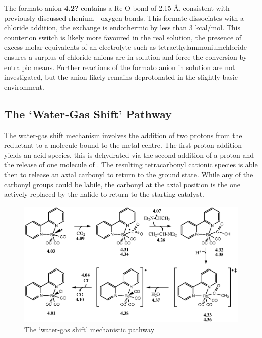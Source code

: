 The formato anion \textbf{4.2?} contains a Re-O bond of 2.15 \r{A}, consistent with previously discussed rhenium - oxygen bonds. This formate dissociates with a chloride addition, the exchange is endothermic by less than 3 kcal/mol. This counterion switch is likely more favoured in the real solution, the presence of excess molar equivalents of an electrolyte such as tetraethylammoniumchloride ensures a surplus of chloride anions are in solution and force the conversion by entralpic means. Further reactions of the formato anion in solution are not investigated, but the anion likely remains deprotonated in the slightly basic environment. 

\FloatBarrier

\subsection{The `Water-Gas Shift' Pathway}\label{ss.watergas}
The water-gas shift mechanism involves the addition of two protons from the reductant to a  molecule bound to the metal centre. The first proton addition yields an acid species, this is dehydrated via the second addition of a proton and the release of one molecule of . The resulting tetracarbonyl cationic species is able then to release an axial carbonyl to return to the ground state. While any of the carbonyl groups could be labile, the carbonyl at the axial position is the one actively replaced by the halide to return to the starting catalyst\autocite{shaver1992}. 

\begin{figure}[!htb]
 \begin{center}
  \includegraphics[clip=true, width=\textwidth, keepaspectratio]{images/watergas.eps}
 \end{center}
\caption{The `water-gas shift' mechanistic pathway}
\label{fig.watergas}
\end{figure} 

